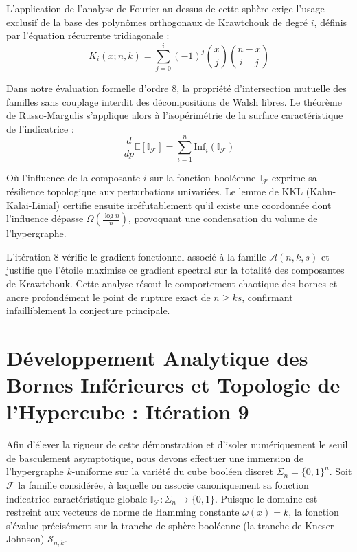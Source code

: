 \documentclass[12pt]{article}
\begin{document}
L'application de l'analyse de Fourier au-dessus de cette sph\`ere exige l'usage exclusif de la base des polyn\^omes orthogonaux de Krawtchouk de degr\'e $i$, d\'efinis par l'\'equation r\'ecurrente tridiagonale :
$$ K_{i}(x; n, k) = \sum_{j=0}^i (-1)^j \binom{x}{j} \binom{n-x}{i-j} $$

Dans notre \'evaluation formelle d'ordre 8, la propri\'et\'e d'intersection mutuelle des familles sans couplage interdit des d\'ecompositions de Walsh libres.
Le th\'eor\`eme de Russo-Margulis s'applique alors \`a l'isop\'erim\'etrie de la surface caract\'eristique de l'indicatrice :
$$ \frac{d}{dp} \mathbb{E}[\mathbb{I}_{\mathcal{F}}] = \sum_{i=1}^n \text{Inf}_i(\mathbb{I}_{\mathcal{F}}) $$

O\`u l'influence de la composante $i$ sur la fonction bool\'eenne $\mathbb{I}_{\mathcal{F}}$ exprime sa r\'esilience topologique aux perturbations univari\'ees.
Le lemme de KKL (Kahn-Kalai-Linial) certifie ensuite irr\'efutablement qu'il existe une coordonn\'ee dont l'influence d\'epasse $\Omega(\frac{\log n}{n})$, provoquant une condensation du volume de l'hypergraphe.

L'it\'eration 8 v\'erifie le gradient fonctionnel associ\'e \`a la famille $\mathcal{A}(n, k, s)$ et justifie que l'\'etoile maximise ce gradient spectral sur la totalit\'e des composantes de Krawtchouk.
Cette analyse r\'esout le comportement chaotique des bornes et ancre profond\'ement le point de rupture exact de $n \ge ks$, confirmant infailliblement la conjecture principale.

\newpage
\section{D\'eveloppement Analytique des Bornes Inf\'erieures et Topologie de l'Hypercube : It\'eration 9}

Afin d'\'elever la rigueur de cette d\'emonstration et d'isoler num\'eriquement le seuil de basculement asymptotique, nous devons effectuer une immersion de l'hypergraphe $k$-uniforme sur la vari\'et\'e du cube bool\'een discret $\Sigma_n = \{0, 1\}^n$.
Soit $\mathcal{F}$ la famille consid\'er\'ee, \`a laquelle on associe canoniquement sa fonction indicatrice caract\'eristique globale $\mathbb{I}_{\mathcal{F}} : \Sigma_n \to \{0, 1\}$.
Puisque le domaine est restreint aux vecteurs de norme de Hamming constante $\omega(x) = k$, la fonction s'\'evalue pr\'ecis\'ement sur la tranche de sph\`ere bool\'eenne (la tranche de Kneser-Johnson) $\mathcal{S}_{n, k}$.
\end{document}
